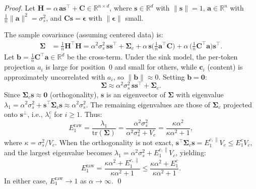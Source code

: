 \documentclass[11pt]{article}
\begin{document}
\begin{proof}
Let $\mathbf{H} = \alpha\,\mathbf{a}\mathbf{s}^\top + \mathbf{C} \in \mathbb{R}^{n \times d}$, where $\mathbf{s} \in \mathbb{R}^d$ with $\|\mathbf{s}\| = 1$, $\mathbf{a} \in \mathbb{R}^n$ with $\frac{1}{n}\|\mathbf{a}\|^2 = \sigma_s^2$, and $\mathbf{C}\mathbf{s} = \boldsymbol{\epsilon}$ with $\|\boldsymbol{\epsilon}\|$ small.

The sample covariance (assuming centered data) is:
\begin{align}
    \boldsymbol{\Sigma} &= \tfrac{1}{n}\mathbf{H}^\top\mathbf{H} = \alpha^2 \sigma_s^2 \,\mathbf{s}\mathbf{s}^\top + \boldsymbol{\Sigma}_c + \alpha\,\mathbf{s}\bigl(\tfrac{1}{n}\mathbf{a}^\top\mathbf{C}\bigr) + \alpha\,\bigl(\tfrac{1}{n}\mathbf{C}^\top\mathbf{a}\bigr)\mathbf{s}^\top.
\end{align}
Let $\mathbf{b} = \frac{1}{n}\mathbf{C}^\top\mathbf{a} \in \mathbb{R}^d$ be the cross-term. Under the sink model, the per-token projection $a_i$ is large for position~0 and small for others, while $\mathbf{c}_i$ (content) is approximately uncorrelated with $a_i$, so $\|\mathbf{b}\| \approx 0$. Setting $\mathbf{b} = \mathbf{0}$:
\begin{equation}
    \boldsymbol{\Sigma} \approx \alpha^2\sigma_s^2\,\mathbf{s}\mathbf{s}^\top + \boldsymbol{\Sigma}_c.
\end{equation}
Since $\boldsymbol{\Sigma}_c\mathbf{s} \approx \mathbf{0}$ (orthogonality), $\mathbf{s}$ is an eigenvector of $\boldsymbol{\Sigma}$ with eigenvalue $\lambda_1 = \alpha^2\sigma_s^2 + \mathbf{s}^\top\boldsymbol{\Sigma}_c\mathbf{s} \approx \alpha^2\sigma_s^2$. The remaining eigenvalues are those of $\boldsymbol{\Sigma}_c$ projected onto $\mathbf{s}^\perp$, i.e., $\lambda_i^c$ for $i \geq 1$. Thus:
\begin{equation}
    E_1^{\text{raw}} = \frac{\lambda_1}{\text{tr}(\boldsymbol{\Sigma})} = \frac{\alpha^2\sigma_s^2}{\alpha^2\sigma_s^2 + V_c} = \frac{\kappa\alpha^2}{\kappa\alpha^2 + 1},
\end{equation}
where $\kappa = \sigma_s^2 / V_c$. When the orthogonality is not exact, $\mathbf{s}^\top\boldsymbol{\Sigma}_c\mathbf{s} = E_1^{c,\parallel} V_c \leq E_1^c V_c$, and the largest eigenvalue becomes $\lambda_1 = \alpha^2\sigma_s^2 + E_1^{c,\parallel}V_c$, yielding:
\begin{equation}
    E_1^{\text{raw}} = \frac{\kappa\alpha^2 + E_1^{c,\parallel}}{\kappa\alpha^2 + 1} \leq \frac{\kappa\alpha^2 + E_1^c}{\kappa\alpha^2 + 1}.
\end{equation}
In either case, $E_1^{\text{raw}} \to 1$ as $\alpha \to \infty$. \qed
\end{proof}
\end{document}

